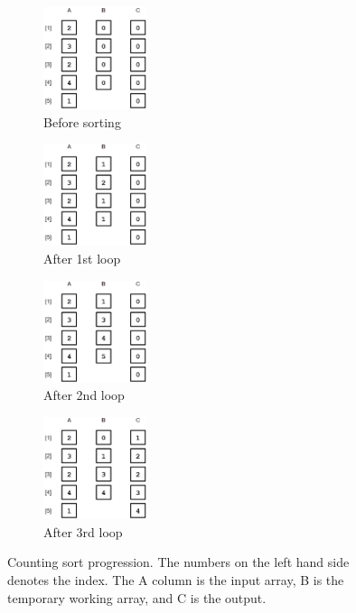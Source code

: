 \documentclass[12pt]{article}
\begin{document}
	\begin{figure}[H]
		
		\begin{subfigure}{0.24\textwidth}
			\includegraphics[width=1.2in]{_0000_count0.png} 
			\caption{Before sorting}
			\label{fig:count1}
		\end{subfigure}
		\begin{subfigure}{0.24\textwidth}
			\includegraphics[width=1.2in]{_0002_count2.png}
			\caption{After 1st loop}
			\label{fig:count2}
		\end{subfigure}
		\begin{subfigure}{0.24\textwidth}
			\includegraphics[width=1.2in]{_0001_count1.png}
			\caption{After 2nd loop}
			\label{fig:count3}
		\end{subfigure}
		\begin{subfigure}{0.24\textwidth}
			\includegraphics[width=1.2in]{_0003_count3.png}
			\caption{After 3rd loop}
			\label{fig:count4}
		\end{subfigure}

		\caption{Counting sort progression. The numbers on the left hand side denotes the index. The A column is the input array, B is the temporary working array, and C is the output.}
		\label{fig:countmerge}
	\end{figure}
	
\end{document}
